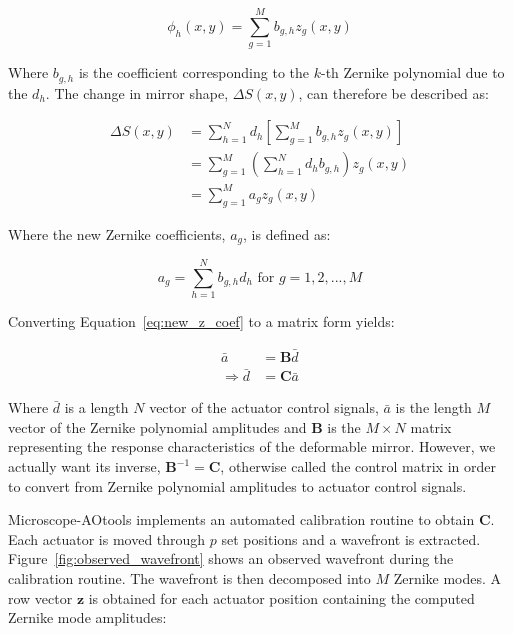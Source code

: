 \begin{equation}\label{eq:influence_to_zernike}
\phi_{h}(x,y) = \sum_{g=1}^{M} b_{g,h}z_{g}(x,y)
\end{equation}

Where $b_{g,h}$ is the coefficient corresponding to the $k$-th Zernike polynomial due to the $d_h$. The change in mirror shape, $\Delta S(x,y)$, can therefore be described as:

\begin{equation}\label{eq:zernike_sub}
\begin{split}
\Delta S(x,y) & = \sum_{h=1}^{N} d_{h}\left[\sum_{g=1}^{M} b_{g,h}z_{g}(x,y)\right] \\
& =\sum_{g=1}^{M} \left(\sum_{h=1}^{N} d_{h} b_{g,h}\right) z_{g}(x,y) \\
& =\sum_{g=1}^{M} a_{g} z_{g}(x,y)
\end{split}
\end{equation}

Where the new Zernike coefficients, $a_{g}$, is defined as:

\begin{equation}\label{eq:new_z_coef}
a_{g} = \sum_{h=1}^{N} b_{g,h} d_{h} \text{~for~} g=1,2,...,M
\end{equation}

Converting Equation~\ref{eq:new_z_coef} to a matrix form yields:

\begin{equation}\label{eq:CM_derivation}
\begin{split}
\bar{a} &= \boldsymbol{B} \bar{d}\\
\Rightarrow \bar{d} &= \boldsymbol{C} \bar{a}
\end{split}
\end{equation}

Where $\bar{d}$ is a length $N$ vector of the actuator control signals, $\bar{a}$ is the length $M$ vector of the Zernike polynomial amplitudes and $\boldsymbol{B}$ is the $M \times N$ matrix representing the response characteristics of the deformable mirror. However, we actually want its inverse, $\boldsymbol{B}^{-1} =\boldsymbol{C}$, otherwise called the control matrix in order to convert from Zernike polynomial amplitudes to actuator control signals.

Microscope-AOtools implements an automated calibration routine to obtain $\boldsymbol{C}$. Each actuator is moved through $p$ set positions and a wavefront is extracted. Figure~\ref{fig:observed_wavefront} shows an observed wavefront during the calibration routine. The wavefront is then decomposed into $M$ Zernike modes\cite{townson2019aotools}. A row vector $\boldsymbol{z}$ is obtained for each actuator position containing the computed Zernike mode amplitudes:

